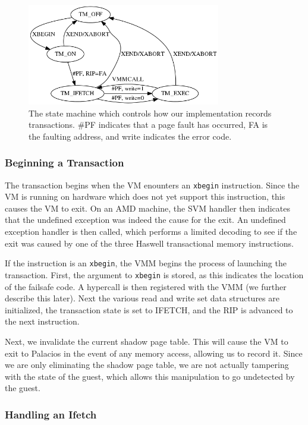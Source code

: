 \documentclass{acm_proc_article-sp}
\begin{document}
\begin{figure}[t]
\centering
\includegraphics[height=1.75in]{figs/fsm.png}
\caption{The state machine which controls how our implementation records 
transactions. \#PF indicates that a page fault has occurred, FA is the faulting
address, and write indicates the error code.}
\label{flowchart}
\end{figure}
\subsubsection{Beginning a Transaction}

The transaction begins when the VM enounters an \texttt{xbegin} instruction. Since the 
VM is running on hardware which does not yet support this instruction, this
causes the VM to exit. On an AMD machine, the SVM handler then indicates that
the undefined exception was indeed the cause for the exit. An undefined 
exception handler is then called, which performs a limited decoding to see
if the exit was caused by one of the three Haswell transactional memory
instructions.    

If the instruction is an \texttt{xbegin}, the VMM begins the process of launching the
transaction. First, the argument to \texttt{xbegin} is stored, as this indicates the 
location of the failsafe code. A hypercall is then registered with the VMM
(we further describe this later). Next the various read and write set data
structures are initialized, the transaction state is set to IFETCH, and the
RIP is advanced to the next instruction.

Next, we invalidate the current shadow page table. This will cause the VM to 
exit to Palacios in the event of any memory access, allowing us to record it.
Since we are only eliminating the shadow page table, we are not actually
tampering with the state of the guest, which allows this manipulation to go
undetected by the guest.

\subsubsection{Handling an Ifetch}
\end{document}
